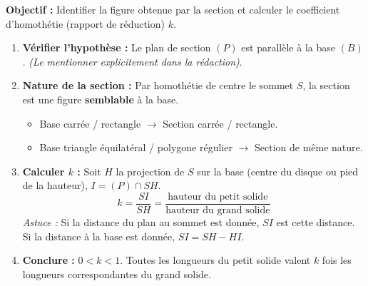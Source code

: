 \documentclass[11pt]{article}
\begin{document}
\begin{methode}
    \textbf{Objectif :} Identifier la figure obtenue par la section et calculer le coefficient d'homothétie (rapport de réduction) $k$.
    \begin{enumerate}
        \item \textbf{Vérifier l'hypothèse :} Le plan de section $(P)$ est parallèle à la base $(B)$. \emph{(Le mentionner explicitement dans la rédaction)}.
        \item \textbf{Nature de la section :} Par homothétie de centre le sommet $S$, la section est une figure \textbf{semblable} à la base.
            \begin{itemize}
                \item Base carrée / rectangle $\rightarrow$ Section carrée / rectangle.
                \item Base triangle équilatéral / polygone régulier $\rightarrow$ Section de même nature.
            \end{itemize}
        \item \textbf{Calculer $k$ :} Soit $H$ la projection de $S$ sur la base (centre du disque ou pied de la hauteur), $I = (P) \cap SH$.
            \[ k = \frac{SI}{SH} = \frac{\text{hauteur du petit solide}}{\text{hauteur du grand solide}} \]
            \emph{Astuce :} Si la distance du plan au sommet est donnée, $SI$ est cette distance. Si la distance à la base est donnée, $SI = SH - HI$.
        \item \textbf{Conclure :} $0 < k < 1$. Toutes les longueurs du petit solide valent $k$ fois les longueurs correspondantes du grand solide.
    \end{enumerate}
\end{methode}
\end{document}
